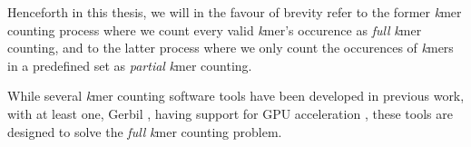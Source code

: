 Henceforth in this thesis, we will in the favour of brevity refer to the former \textit{k}mer counting process where we count every valid \textit{k}mer's occurence as \textit{full} \textit{k}mer counting, and to the latter process where we only count the occurences of \textit{k}mers in a predefined set as \textit{partial} \textit{k}mer counting.

While several \textit{k}mer counting software tools have been developed in previous work, with at least one, Gerbil \cite{gerbil}, having support for GPU acceleration \cite{kmer_counting_tools}, these tools are designed to solve the \textit{full} \textit{k}mer counting problem.
